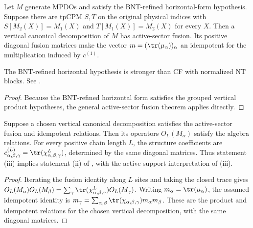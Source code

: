\begin{lemma}%
    \label{thm:mpdo_horizontal_rfp_to_bnt_fusion_tensor}
    \leanok
    Let $M$ generate MPDOs and satisfy the BNT-refined
    horizontal-form hypothesis. Suppose there are tpCPM $S,T$ on the
    original physical indices with $S[M_2(X)]=M_1(X)$ and
    $T[M_1(X)]=M_2(X)$ for every $X$. Then a vertical canonical
    decomposition of $M$ has active-sector fusion. Its positive diagonal
    fusion matrices make the vector $m=(\tr(\mu_\alpha))_\alpha$ an
    idempotent for the multiplication induced by $c^{(1)}$.

    The BNT-refined horizontal hypothesis is stronger than
    CF with normalized NT blocks.
    See \cite{gap:cpgsv17_vertical_cf_grouping}.
\end{lemma}
\begin{proof}\leanok
    Because the BNT-refined horizontal form satisfies the grouped
    vertical product hypotheses, the general active-sector fusion theorem
    applies directly.
\end{proof}

\begin{lemma}%
    \label{thm:mpdo_bnt_fusion_tensor_to_algebra_tensor}
    \leanok
    Suppose a chosen vertical canonical decomposition satisfies the
    active-sector fusion and idempotent relations.
    Then its operators $O_L(M_\alpha)$ satisfy the algebra relations.
    For every positive chain length $L$, the structure coefficients are
    $c^{(L)}_{\alpha,\beta,\gamma}
        =\tr(\chi_{\alpha,\beta,\gamma}^{L})$,
    determined by the same diagonal matrices. Thus statement (iii) implies
    statement (ii) of
    \cite[Theorem~4.14, lines~972--993]{Cirac2016MPDO_arXiv}, with the
    active-support interpretation of (iii).
\end{lemma}
\begin{proof}\leanok
    Iterating the fusion identity along $L$ sites and taking the closed trace
    gives
    $O_L(M_\alpha)O_L(M_\beta)
        =\sum_\gamma
        \tr(\chi_{\alpha,\beta,\gamma}^{L})O_L(M_\gamma)$.
    Writing $m_\alpha=\tr(\mu_\alpha)$, the assumed
    idempotent identity is
    $m_\gamma=\sum_{\alpha,\beta}
        \tr(\chi_{\alpha,\beta,\gamma})m_\alpha m_\beta$.
    These are the product and idempotent relations for the chosen
    vertical decomposition, with the same diagonal matrices.
\end{proof}

